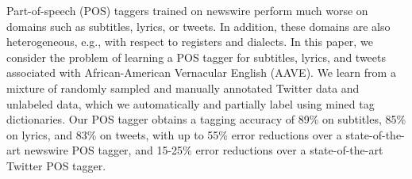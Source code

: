 Part-of-speech (POS) taggers trained on newswire perform much worse on domains such as subtitles, lyrics, or tweets. In addition, these domains are also heterogeneous, e.g., with respect to registers and dialects. In this paper, we consider the problem of learning a POS tagger for subtitles, lyrics, and tweets associated with African-American Vernacular English (AAVE). We learn from a mixture of randomly sampled and manually annotated Twitter data and unlabeled data, which we automatically and partially label using mined tag dictionaries. Our POS tagger obtains a tagging accuracy of 89\% on subtitles, 85\% on lyrics, and 83\% on tweets, with up to 55\% error reductions over a state-of-the-art newswire POS tagger, and 15-25\% error reductions over a state-of-the-art Twitter POS tagger.
